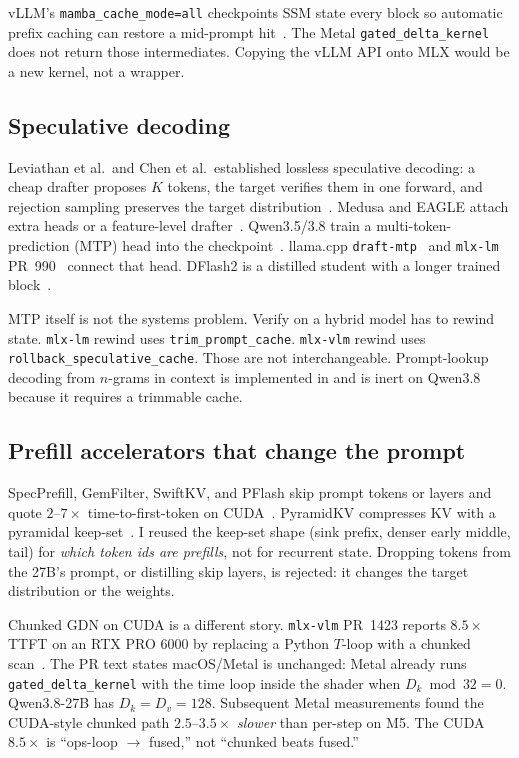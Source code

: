 vLLM's \texttt{mamba\_cache\_mode=all} checkpoints SSM state every block so automatic prefix caching can restore a mid-prompt hit~\citep{vllm36649}. The Metal \texttt{gated\_delta\_kernel} does not return those intermediates. Copying the vLLM API onto MLX would be a new kernel, not a wrapper.

\subsection{Speculative decoding}

Leviathan et al.\ and Chen et al.\ established lossless speculative decoding: a cheap drafter proposes $K$ tokens, the target verifies them in one forward, and rejection sampling preserves the target distribution~\citep{leviathan2023speculative,chen2023accelerating}. Medusa and EAGLE attach extra heads or a feature-level drafter~\citep{cai2024medusa,li2024eagle}. Qwen3.5/3.8 train a multi-token-prediction (MTP) head into the checkpoint~\citep{qwen3,qwen38card}. llama.cpp \texttt{draft-mtp}~\citep{ctaylor83mtp} and \texttt{mlx-lm} PR~990~\citep{mlxlm990} connect that head. DFlash2 is a distilled student with a longer trained block~\citep{zlabdflash}.

MTP itself is not the systems problem. Verify on a hybrid model has to rewind \gdn{} state. \texttt{mlx-lm} rewind uses \texttt{trim\_prompt\_cache}. \texttt{mlx-vlm} rewind uses \texttt{rollback\_speculative\_cache}. Those are not interchangeable. Prompt-lookup decoding from $n$-grams in context is implemented in \slotbank{} and is inert on Qwen3.8 because it requires a trimmable cache.

\subsection{Prefill accelerators that change the prompt}

SpecPrefill, GemFilter, SwiftKV, and PFlash skip prompt tokens or layers and quote $2$--$7\times$ time-to-first-token on CUDA~\citep{yuan2024specprefill,swiftkv}. PyramidKV compresses KV with a pyramidal keep-set~\citep{pyramidkv}. I reused the keep-set shape (sink prefix, denser early middle, tail) for \emph{which token ids are prefills}, not for recurrent state. Dropping tokens from the 27B's prompt, or distilling skip layers, is rejected: it changes the target distribution or the weights.

Chunked GDN on CUDA is a different story. \texttt{mlx-vlm} PR~1423 reports $8.5\times$ TTFT on an RTX PRO 6000 by replacing a Python $T$-loop with a chunked scan~\citep{mlxvlm1423}. The PR text states macOS/Metal is unchanged: Metal already runs \texttt{gated\_delta\_kernel} with the time loop inside the shader when $D_k \bmod 32 = 0$. Qwen3.8-27B has $D_k = D_v = 128$. Subsequent Metal measurements found the CUDA-style chunked path $2.5$--$3.5\times$ \emph{slower} than per-step on M5. The CUDA $8.5\times$ is ``ops-loop $\to$ fused,'' not ``chunked beats fused.''

